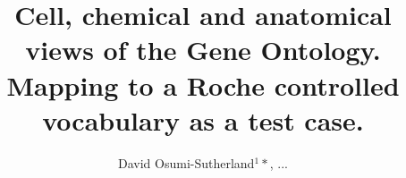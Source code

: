 \documentclass[runningheads,a4paper]{llncs}
\begin{document}
\mainmatter  %

\title{Cell, chemical and anatomical views of the Gene Ontology.  Mapping to a Roche controlled vocabulary as a test case.}


%
%
\author{David Osumi-Sutherland$^1*$, ...}

%
\end{document}
